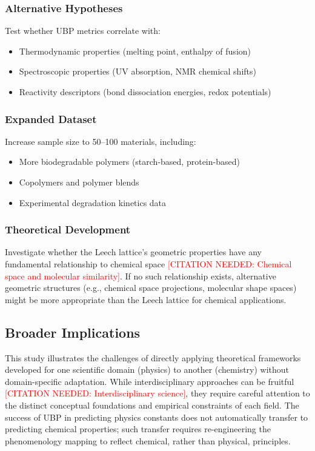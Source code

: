 \documentclass[11pt,letterpaper]{article}
\begin{document}
\subsubsection{Alternative Hypotheses}
Test whether UBP metrics correlate with:
\begin{itemize}
    \item Thermodynamic properties (melting point, enthalpy of fusion)
    \item Spectroscopic properties (UV absorption, NMR chemical shifts)
    \item Reactivity descriptors (bond dissociation energies, redox potentials)
\end{itemize}

\subsubsection{Expanded Dataset}
Increase sample size to 50--100 materials, including:
\begin{itemize}
    \item More biodegradable polymers (starch-based, protein-based)
    \item Copolymers and polymer blends
    \item Experimental degradation kinetics data
\end{itemize}

\subsubsection{Theoretical Development}
Investigate whether the Leech lattice's geometric properties have any fundamental relationship to chemical space \textcolor{red}{[CITATION NEEDED: Chemical space and molecular similarity]}. If no such relationship exists, alternative geometric structures (e.g., chemical space projections, molecular shape spaces) might be more appropriate than the Leech lattice for chemical applications.

\subsection{Broader Implications}

This study illustrates the challenges of directly applying theoretical frameworks developed for one scientific domain (physics) to another (chemistry) without domain-specific adaptation. While interdisciplinary approaches can be fruitful \textcolor{red}{[CITATION NEEDED: Interdisciplinary science]}, they require careful attention to the distinct conceptual foundations and empirical constraints of each field. The success of UBP in predicting physics constants does not automatically transfer to predicting chemical properties; such transfer requires re-engineering the phenomenology mapping to reflect chemical, rather than physical, principles.
\end{document}
